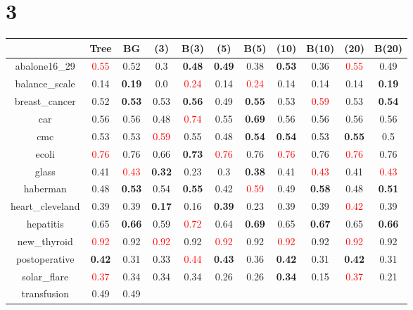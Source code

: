 \documentclass{article}%
\begin{document}
\section*{3}%
\begin{tabular}{c|cccccccccc}%
\hline%
&Tree&BG&(3)&B(3)&(5)&B(5)&(10)&B(10)&(20)&B(20)\\%
\hline%
abalone16\_29&\textcolor{red}{ 
0.55
}&0.52&0.3&\textbf{0.48}&\textbf{0.49}&0.38&\textbf{0.53}&0.36&\textcolor{red}{ 
0.55
}&0.49\\%
\hline%
balance\_scale&0.14&\textbf{0.19}&0.0&\textcolor{red}{ 
0.24
}&0.14&\textcolor{red}{ 
0.24
}&0.14&0.14&0.14&\textbf{0.19}\\%
\hline%
breast\_cancer&0.52&\textbf{0.53}&0.53&\textbf{0.56}&0.49&\textbf{0.55}&0.53&\textcolor{red}{ 
0.59
}&0.53&\textbf{0.54}\\%
\hline%
car&0.56&0.56&0.48&\textcolor{red}{ 
0.74
}&0.55&\textbf{0.69}&0.56&0.56&0.56&0.56\\%
\hline%
cmc&0.53&0.53&\textcolor{red}{ 
0.59
}&0.55&0.48&\textbf{0.54}&\textbf{0.54}&0.53&\textbf{0.55}&0.5\\%
\hline%
ecoli&\textcolor{red}{ 
0.76
}&0.76&0.66&\textbf{0.73}&\textcolor{red}{ 
0.76
}&0.76&\textcolor{red}{ 
0.76
}&0.76&\textcolor{red}{ 
0.76
}&0.76\\%
\hline%
glass&0.41&\textcolor{red}{ 
0.43
}&\textbf{0.32}&0.23&0.3&\textbf{0.38}&0.41&\textcolor{red}{ 
0.43
}&0.41&\textcolor{red}{ 
0.43
}\\%
\hline%
haberman&0.48&\textbf{0.53}&0.54&\textbf{0.55}&0.42&\textcolor{red}{ 
0.59
}&0.49&\textbf{0.58}&0.48&\textbf{0.51}\\%
\hline%
heart\_cleveland&0.39&0.39&\textbf{0.17}&0.16&\textbf{0.39}&0.23&0.39&0.39&\textcolor{red}{ 
0.42
}&0.39\\%
\hline%
hepatitis&0.65&\textbf{0.66}&0.59&\textcolor{red}{ 
0.72
}&0.64&\textbf{0.69}&0.65&\textbf{0.67}&0.65&\textbf{0.66}\\%
\hline%
new\_thyroid&\textcolor{red}{ 
0.92
}&0.92&\textcolor{red}{ 
0.92
}&0.92&\textcolor{red}{ 
0.92
}&0.92&\textcolor{red}{ 
0.92
}&0.92&\textcolor{red}{ 
0.92
}&0.92\\%
\hline%
postoperative&\textbf{0.42}&0.31&0.33&\textcolor{red}{ 
0.44
}&\textbf{0.43}&0.36&\textbf{0.42}&0.31&\textbf{0.42}&0.31\\%
\hline%
solar\_flare&\textcolor{red}{ 
0.37
}&0.34&0.34&0.34&0.26&0.26&\textbf{0.34}&0.15&\textcolor{red}{ 
0.37
}&0.21\\%
\hline%
transfusion&0.49&0.49&\textcolor{red}{ 
}
\end{tabular}
\end{document}
